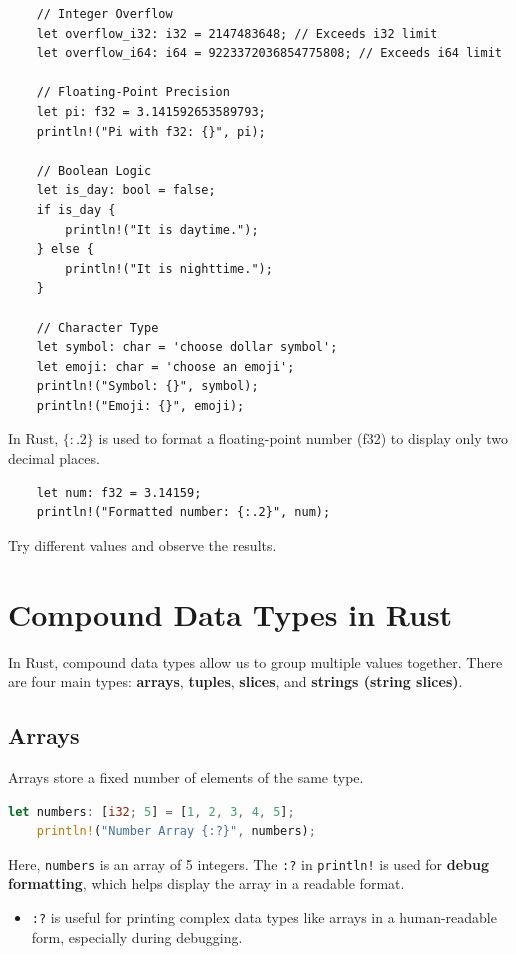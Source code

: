 \documentclass[a4paper,12pt]{report}
\begin{document}
\begin{lstlisting}
	// Integer Overflow
	let overflow_i32: i32 = 2147483648; // Exceeds i32 limit
	let overflow_i64: i64 = 9223372036854775808; // Exceeds i64 limit
	
	// Floating-Point Precision
	let pi: f32 = 3.141592653589793;
	println!("Pi with f32: {}", pi);
	
	// Boolean Logic
	let is_day: bool = false;
	if is_day {
		println!("It is daytime.");
	} else {
		println!("It is nighttime.");
	}
	
	// Character Type
	let symbol: char = 'choose dollar symbol';
	let emoji: char = 'choose an emoji';
	println!("Symbol: {}", symbol);
	println!("Emoji: {}", emoji);
\end{lstlisting}

	\noindent In Rust, $\{:.2\}$ is used to format a floating-point number (f32) to display only two decimal places.

\begin{lstlisting}
	let num: f32 = 3.14159;
	println!("Formatted number: {:.2}", num);
\end{lstlisting}

	\noindent Try different values and observe the results.

	
	
\section{Compound Data Types in Rust}

In Rust, compound data types allow us to group multiple values together. There are four main types: \textbf{arrays}, \textbf{tuples}, \textbf{slices}, and \textbf{strings (string slices)}.

\subsection*{Arrays}
Arrays store a fixed number of elements of the same type.

\begin{lstlisting}[language=Rust]
	let numbers: [i32; 5] = [1, 2, 3, 4, 5];
	println!("Number Array {:?}", numbers);
\end{lstlisting}

	\noindent Here, \texttt{numbers} is an array of 5 integers. The \texttt{:?} in \texttt{println!} is used for \textbf{debug formatting}, which helps display the array in a readable format.

\begin{itemize}
	\item \texttt{:?} is useful for printing complex data types like arrays in a human-readable form, especially during debugging.
\end{itemize}
\end{document}
